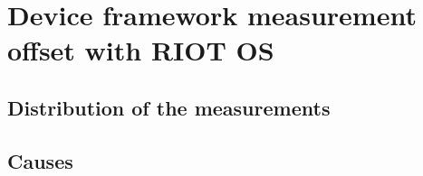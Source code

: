 \section{Device framework measurement offset with RIOT OS}

\subsection{Distribution of the measurements}

\subsection{Causes}